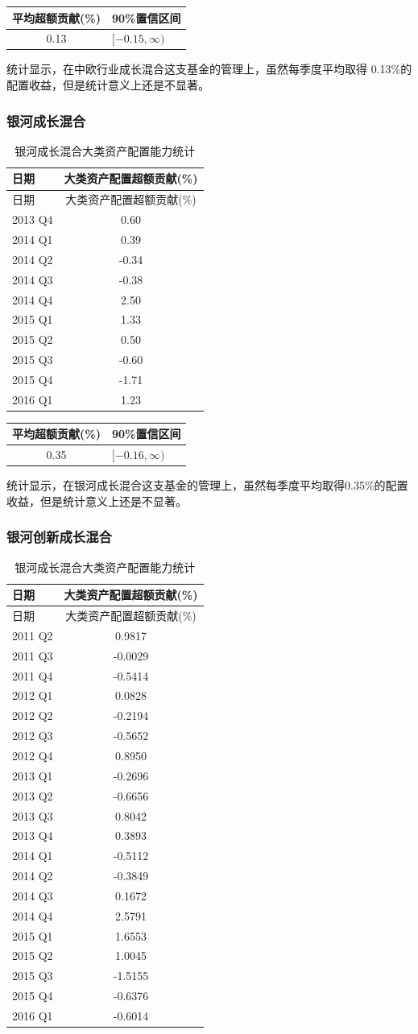 \documentclass[hyperref,]{ctexart}
\begin{document}
\begin{longtable}[]{@{}cl@{}}
\toprule
平均超额贡献(\%) & 90\%置信区间\tabularnewline
\midrule
\endhead
0.13 & \([-0.15,\infty)\)\tabularnewline
\bottomrule
\end{longtable}

统计显示，在中欧行业成长混合这支基金的管理上，虽然每季度平均取得
0.13\%的配置收益，但是统计意义上还是不显著。

\subsubsection{银河成长混合}\label{-1}

\begin{longtable}[]{@{}lc@{}}
\caption{银河成长混合大类资产配置能力统计}\tabularnewline
\toprule
日期 & 大类资产配置超额贡献(\%)\tabularnewline
\midrule
\endfirsthead
\toprule
日期 & 大类资产配置超额贡献(\%)\tabularnewline
\midrule
\endhead
2013 Q4 & 0.60\tabularnewline
2014 Q1 & 0.39\tabularnewline
2014 Q2 & -0.34\tabularnewline
2014 Q3 & -0.38\tabularnewline
2014 Q4 & 2.50\tabularnewline
2015 Q1 & 1.33\tabularnewline
2015 Q2 & 0.50\tabularnewline
2015 Q3 & -0.60\tabularnewline
2015 Q4 & -1.71\tabularnewline
2016 Q1 & 1.23\tabularnewline
\bottomrule
\end{longtable}

\begin{longtable}[]{@{}cl@{}}
\toprule
平均超额贡献(\%) & 90\%置信区间\tabularnewline
\midrule
\endhead
0.35 & \([-0.16,\infty)\)\tabularnewline
\bottomrule
\end{longtable}

统计显示，在银河成长混合这支基金的管理上，虽然每季度平均取得0.35\%的配置收益，但是统计意义上还是不显著。

\subsubsection{银河创新成长混合}\label{-1}

\begin{longtable}[]{@{}lc@{}}
\caption{银河成长混合大类资产配置能力统计}\tabularnewline
\toprule
日期 & 大类资产配置超额贡献(\%)\tabularnewline
\midrule
\endfirsthead
\toprule
日期 & 大类资产配置超额贡献(\%)\tabularnewline
\midrule
\endhead
2011 Q2 & 0.9817\tabularnewline
2011 Q3 & -0.0029\tabularnewline
2011 Q4 & -0.5414\tabularnewline
2012 Q1 & 0.0828\tabularnewline
2012 Q2 & -0.2194\tabularnewline
2012 Q3 & -0.5652\tabularnewline
2012 Q4 & 0.8950\tabularnewline
2013 Q1 & -0.2696\tabularnewline
2013 Q2 & -0.6656\tabularnewline
2013 Q3 & 0.8042\tabularnewline
2013 Q4 & 0.3893\tabularnewline
2014 Q1 & -0.5112\tabularnewline
2014 Q2 & -0.3849\tabularnewline
2014 Q3 & 0.1672\tabularnewline
2014 Q4 & 2.5791\tabularnewline
2015 Q1 & 1.6553\tabularnewline
2015 Q2 & 1.0045\tabularnewline
2015 Q3 & -1.5155\tabularnewline
2015 Q4 & -0.6376\tabularnewline
2016 Q1 & -0.6014\tabularnewline
\bottomrule
\end{longtable}
\end{document}
